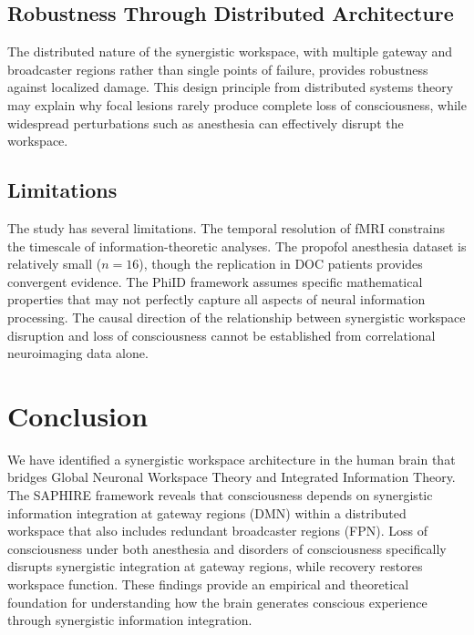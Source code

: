 \documentclass[11pt]{article}
\begin{document}
\subsection{Robustness Through Distributed Architecture}

The distributed nature of the synergistic workspace, with multiple gateway and broadcaster regions rather than single points of failure, provides robustness against localized damage. This design principle from distributed systems theory may explain why focal lesions rarely produce complete loss of consciousness, while widespread perturbations such as anesthesia can effectively disrupt the workspace.

\subsection{Limitations}

The study has several limitations. The temporal resolution of fMRI constrains the timescale of information-theoretic analyses. The propofol anesthesia dataset is relatively small ($n = 16$), though the replication in DOC patients provides convergent evidence. The PhiID framework assumes specific mathematical properties that may not perfectly capture all aspects of neural information processing. The causal direction of the relationship between synergistic workspace disruption and loss of consciousness cannot be established from correlational neuroimaging data alone.

\section{Conclusion}

We have identified a synergistic workspace architecture in the human brain that bridges Global Neuronal Workspace Theory and Integrated Information Theory. The SAPHIRE framework reveals that consciousness depends on synergistic information integration at gateway regions (DMN) within a distributed workspace that also includes redundant broadcaster regions (FPN). Loss of consciousness under both anesthesia and disorders of consciousness specifically disrupts synergistic integration at gateway regions, while recovery restores workspace function. These findings provide an empirical and theoretical foundation for understanding how the brain generates conscious experience through synergistic information integration.



\end{document}
